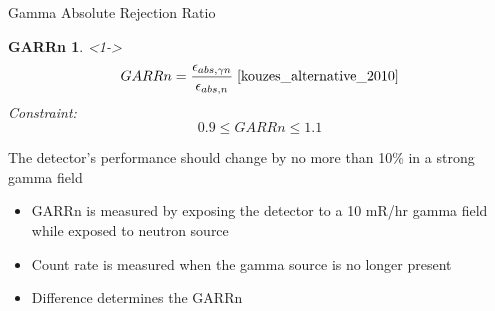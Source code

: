 \begin{frame}{Gamma Absolute Rejection Ratio}
\newtheorem{thm3}{GARRn}
\begin{thm3}<1->
$$ GARRn = \frac{\epsilon_{abs,\gamma n}}{\epsilon_{abs,n}} \; \protect \cite{kouzes_alternative_2010} $$
Constraint:
$$ 0.9 \leq GARRn \leq 1.1 $$
\end{thm3}
The detector's performance should change by no more than 10\% in a strong gamma field
\begin{itemize}
	\item GARRn is measured by exposing the detector to a 10 mR/hr gamma field while exposed to neutron source
	\item Count rate is measured when the gamma source is no longer present
	\item Difference determines the GARRn
\end{itemize}
\end{frame}


